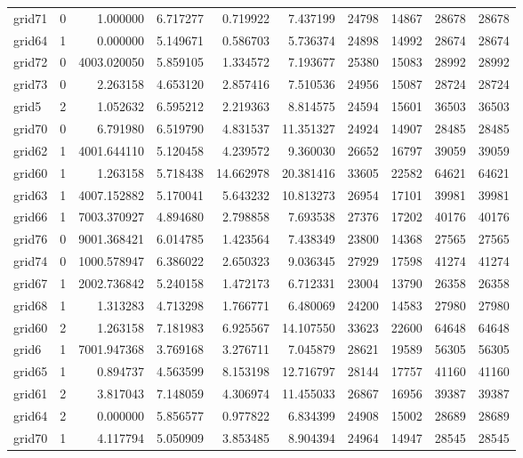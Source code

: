 \begin{longtable}{|l|r|r|r|r|r|r|r|r|r|}
grid71 & 0 & 1.000000 & 6.717277 & 0.719922 & 7.437199 & 24798 & 14867 & 28678 & 28678 \\
grid64 & 1 & 0.000000 & 5.149671 & 0.586703 & 5.736374 & 24898 & 14992 & 28674 & 28674 \\
grid72 & 0 & 4003.020050 & 5.859105 & 1.334572 & 7.193677 & 25380 & 15083 & 28992 & 28992 \\
grid73 & 0 & 2.263158 & 4.653120 & 2.857416 & 7.510536 & 24956 & 15087 & 28724 & 28724 \\
grid5 & 2 & 1.052632 & 6.595212 & 2.219363 & 8.814575 & 24594 & 15601 & 36503 & 36503 \\
grid70 & 0 & 6.791980 & 6.519790 & 4.831537 & 11.351327 & 24924 & 14907 & 28485 & 28485 \\
grid62 & 1 & 4001.644110 & 5.120458 & 4.239572 & 9.360030 & 26652 & 16797 & 39059 & 39059 \\
grid60 & 1 & 1.263158 & 5.718438 & 14.662978 & 20.381416 & 33605 & 22582 & 64621 & 64621 \\
grid63 & 1 & 4007.152882 & 5.170041 & 5.643232 & 10.813273 & 26954 & 17101 & 39981 & 39981 \\
grid66 & 1 & 7003.370927 & 4.894680 & 2.798858 & 7.693538 & 27376 & 17202 & 40176 & 40176 \\
grid76 & 0 & 9001.368421 & 6.014785 & 1.423564 & 7.438349 & 23800 & 14368 & 27565 & 27565 \\
grid74 & 0 & 1000.578947 & 6.386022 & 2.650323 & 9.036345 & 27929 & 17598 & 41274 & 41274 \\
grid67 & 1 & 2002.736842 & 5.240158 & 1.472173 & 6.712331 & 23004 & 13790 & 26358 & 26358 \\
grid68 & 1 & 1.313283 & 4.713298 & 1.766771 & 6.480069 & 24200 & 14583 & 27980 & 27980 \\
grid60 & 2 & 1.263158 & 7.181983 & 6.925567 & 14.107550 & 33623 & 22600 & 64648 & 64648 \\
grid6 & 1 & 7001.947368 & 3.769168 & 3.276711 & 7.045879 & 28621 & 19589 & 56305 & 56305 \\
grid65 & 1 & 0.894737 & 4.563599 & 8.153198 & 12.716797 & 28144 & 17757 & 41160 & 41160 \\
grid61 & 2 & 3.817043 & 7.148059 & 4.306974 & 11.455033 & 26867 & 16956 & 39387 & 39387 \\
grid64 & 2 & 0.000000 & 5.856577 & 0.977822 & 6.834399 & 24908 & 15002 & 28689 & 28689 \\
grid70 & 1 & 4.117794 & 5.050909 & 3.853485 & 8.904394 & 24964 & 14947 & 28545 & 28545 \\

\end{longtable}
